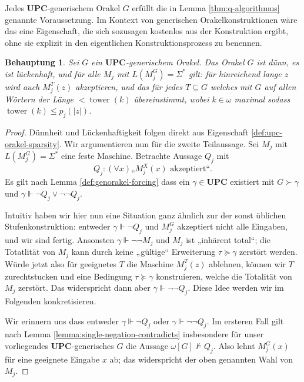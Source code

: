 \documentclass[nofonts]{uebung}
\newtheorem{claim}[theorem]{Behauptung}
\theoremstyle{definition}
\DeclareMathOperator{\tower}{tower}
\begin{document}
Jedes $\mathbf{UPC}$-generischem Orakel $G$ erfüllt die in Lemma \ref{thm:q-algorithmus} genannte Voraussetzung.
Im Kontext von generischen Orakelkonstruktionen wäre das eine Eigenschaft, die sich sozusagen kostenlos aus der Konstruktion ergibt, ohne sie explizit in den eigentlichen Konstruktionsprozess zu benennen.
\begin{claim}\label{claim:upc-erfüllt-q-bedingungen}
    Sei $G$ ein $\mathbf{UPC}$-generischem Orakel.
    Das Orakel $G$ ist dünn, es ist lückenhaft, und für alle $M_j$ mit $L(M_j^G)=\Sigma^*$ gilt: für hinreichend lange $z$ wird auch $M_j^T(z)$ akzeptieren, und das für jedes $T\subseteq G$ welches mit $G$ auf allen Wörtern der Länge $<\tower(k)$ übereinstimmt, wobei $k\in\omega$ maximal sodass $\tower(k)\leq p_j(|z|)$.
\end{claim}
\begin{proof}
    Dünnheit und Lückenhaftigkeit folgen direkt aus Eigenschaft \ref{def:upc-orakel-sparsity}.
    Wir argumentieren nun für die zweite Teilaussage. Sei $M_j$ mit $L(M_j^G)=\Sigma^*$ eine feste Maschine.
    Betrachte Aussage $Q_j$ mit
    \[ Q_j: (\forall x)\text{„$M_j^X(x)$ akzeptiert“}. \]
    Es gilt nach Lemma \ref{def:genorakel-forcing} dass ein $\gamma\in \mathbf{UPC}$ existiert mit $G\succ \gamma$ und $\gamma\Vdash \neg Q_j\lor \neg\neg Q_j$.

    Intuitiv haben wir hier nun eine Situation ganz ähnlich zur der sonst üblichen Stufenkonstruktion: entweder $\gamma\Vdash\neg Q_j$ und $M_j^G$ akzeptiert nicht alle Eingaben, und wir sind fertig.
    Ansonsten $\gamma\Vdash\neg\neg M_j$ und $M_j$ ist „inhärent total“; die Totatlität von $M_j$ kann durch keine „gültige“ Erweiterung $\tau\succeq \gamma$ zerstört werden. Würde jetzt also für geeignetes $T$ die Maschine $M_j^T(z)$ ablehnen, können wir $T$ zurechtstucken und eine Bedingung $\tau\succeq\gamma$ konstruieren, welche die Totalität von $M_j$ zerstört. Das widerspricht dann aber $\gamma\Vdash\neg\neg Q_j$.
    Diese Idee werden wir im Folgenden konkretisieren.



    Wir erinnern uns dass entweder $\gamma\Vdash\neg Q_j$ oder $\gamma\Vdash\neg\neg Q_j$.
    Im ersteren Fall gilt nach Lemma \ref{lemma:single-negation-contradicts} insbesondere für unser vorliegendes $\mathbf{UPC}$-generisches $G$ die Aussage $\omega[G] \not\vDash Q_j$.
    Also lehnt $M_j^G(x)$ für eine geeignete Eingabe $x$ ab; das widerspricht der oben genannten Wahl von $M_j$.


\end{proof}
\end{document}
